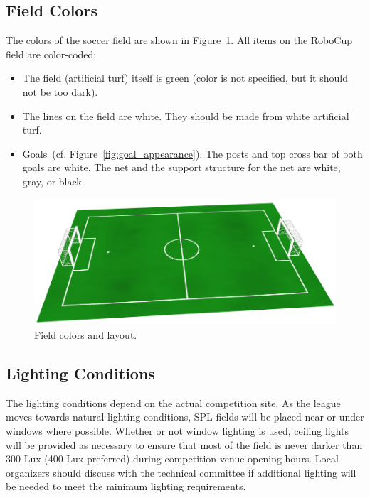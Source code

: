 \documentclass[12pt]{article}
\newcommand{\cf}{\mbox{cf.}\xspace}
\begin{document}
\subsection{Field Colors}

The colors of the soccer field are shown in Figure~\ref{fig:field_color}. All items on the RoboCup field are color-coded:

\begin{itemize}

\item The field (artificial turf) itself is green (color is not specified, but it should not be too dark).

\item The lines on the field are white. They should be made from white artificial turf.

\item Goals~(\cf Figure~\ref{fig:goal_appearance}). The posts and top cross bar of both goals are white. The net and the support structure for the net are white, gray, or black.

\end{itemize}

\begin{figure}[t]
\centerline{\includegraphics[width=\columnwidth]{figs/emptyfield_2015.png}}
\caption{Field colors and layout.}
\label{fig:field_color}
\end{figure}

\subsection{Lighting Conditions}
\label{sec:lightConditions}
The lighting conditions depend on the actual competition site. As the league moves towards natural lighting conditions, SPL fields will be placed near or under windows where possible. Whether or not window lighting is used, ceiling lights will be provided as necessary to ensure that most of the field is never darker than 300 Lux (400 Lux preferred) during competition venue opening hours. Local organizers should discuss with the technical committee if additional lighting will be needed to meet the minimum lighting requirements.
\end{document}
